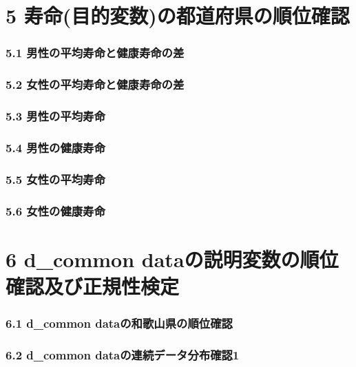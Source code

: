 \chapter{5 寿命(目的変数)の都道府県の順位確認}




\subsection{5.1 男性の平均寿命と健康寿命の差}

\subsection{5.2 女性の平均寿命と健康寿命の差}


\subsection{5.3 男性の平均寿命}


\subsection{5.4 男性の健康寿命}


\subsection{5.5 女性の平均寿命}



\subsection{5.6 女性の健康寿命}







\chapter{6 d\_common dataの説明変数の順位確認及び正規性検定}



\subsection{6.1 d\_common dataの和歌山県の順位確認}

\subsection{6.2 d\_common dataの連続データ分布確認1}

